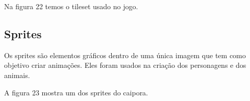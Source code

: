 Na figura 22 temos o tileset usado no jogo.
\begin{figure}[h!]
		\centering
	\end{figure}

\subsection{Sprites}
Os sprites são elementos gráficos dentro de uma única imagem que tem como objetivo criar animações. Eles foram usados na criação dos personagens e dos animais.

A figura 23 mostra um dos sprites do caipora.

\begin{figure}[h!]
		\centering
	\end{figure}


